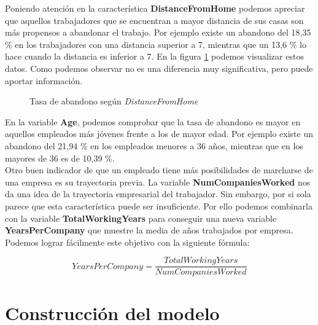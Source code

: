 Poniendo atención en la característica \textbf{DistanceFromHome} podemos apreciar que aquellos trabajadores que se encuentran a mayor distancia de sus casas son más propensos a abandonar el trabajo.
Por ejemplo existe un abandono del 18,35 \% en los trabajadores con una distancia superior a 7, mientras que un 13,6 \% lo hace cuando la distancia es inferior a 7. En la figura \ref{fig:attrition_distance} podemos visualizar estos datos. Como podemos observar no es una diferencia muy significativa, pero puede aportar información.\\


\begin{figure}
\centering
{}
\qquad
{}
\caption{Tasa de abandono según \textit{DistanceFromHome}}
\label{fig:attrition_distance}
\end{figure}


En la variable \textbf{Age}, podemos comprobar que la tasa de abandono es  mayor en aquellos empleados más jóvenes frente a los de mayor edad.
Por ejemplo existe un abandono del 21,94 \% en los empleados menores a 36 años, mientras que en los mayores de 36 es de 10,39 \%.\\

Otro buen indicador de que un empleado tiene más posibilidades de marcharse de una empresa es su trayectoria previa. La variable \textbf{NumCompaniesWorked} nos da una idea de la trayectoria empresarial del trabajador.
Sin embargo, por si sola parece que esta característica puede ser insuficiente. Por ello podemos combinarla con la variable \textbf{TotalWorkingYears} para conseguir una nueva variable \textbf{YearsPerCompany} que muestre la media de años trabajados por 
empresa.\\

Podemos lograr fácilmente este objetivo con la siguiente fórmula:

\[ \mathit{YearsPerCompany} = \frac{\mathit{TotalWorkingYears}}{\mathit{NumCompaniesWorked}}\]



\section{Construcción del modelo}


